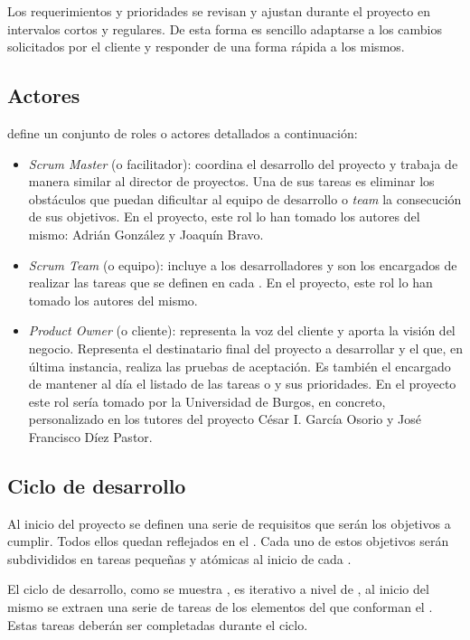Los requerimientos y prioridades se revisan y ajustan durante el proyecto en intervalos cortos y regulares. De esta forma es sencillo adaptarse a los cambios solicitados por el cliente y responder de una forma rápida a los mismos.

\subsection{Actores}
\scrum{} define un conjunto de roles o actores detallados a continuación:
\begin{itemize}
 \item \textit{Scrum Master} (o facilitador): coordina el desarrollo del proyecto y trabaja de manera similar al director de proyectos. Una de sus tareas es eliminar los obstáculos que puedan dificultar al equipo de desarrollo o \textit{team} la consecución de sus objetivos. En el proyecto, este rol lo han tomado los autores del mismo: Adrián González y Joaquín Bravo.
 \item \textit{Scrum Team} (o equipo): incluye a los desarrolladores y son los encargados de realizar las tareas que se definen en cada \sprint{}. En el proyecto, este rol lo han tomado los autores del mismo.
 \item \textit{Product Owner} (o cliente): representa la voz del cliente y aporta la visión del negocio. Representa el destinatario final del proyecto a desarrollar y el que, en última instancia, realiza las pruebas de aceptación. Es también el encargado de mantener al día el listado de las tareas o \productbacklog{} y sus prioridades. En el proyecto este rol sería tomado por la Universidad de Burgos, en concreto, personalizado en los tutores del proyecto César I. García Osorio y José Francisco Díez Pastor.
\end{itemize}

\subsection{Ciclo de desarrollo}
Al inicio del proyecto se definen una serie de requisitos que serán los objetivos a cumplir. Todos ellos quedan reflejados en el \productbacklog{}. Cada uno de estos objetivos serán subdivididos en tareas pequeñas y atómicas al inicio de cada \sprint{}.

El ciclo de desarrollo, como se muestra , es iterativo a nivel de \sprint{}, al inicio del mismo se extraen una serie de tareas de los elementos del \productbacklog{} que conforman el \sprintbacklog{}. Estas tareas deberán ser completadas durante el ciclo.

